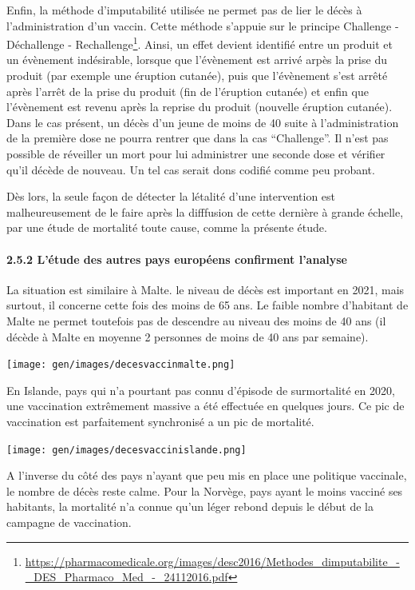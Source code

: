\documentclass[
]{article}
\begin{document}
Enfin, la méthode d'imputabilité utilisée ne permet pas de lier le décès
à l'administration d'un vaccin. Cette méthode s'appuie sur le principe
Challenge - Déchallenge - Rechallenge\footnote{\url{https://pharmacomedicale.org/images/desc2016/Methodes_dimputabilite_-_DES_Pharmaco_Med_-_24112016.pdf}}.
Ainsi, un effet devient identifié entre un produit et un évènement
indésirable, lorsque que l'évènement est arrivé arpès la prise du
produit (par exemple une éruption cutanée), puis que l'évènement s'est
arrêté après l'arrêt de la prise du produit (fin de l'éruption cutanée)
et enfin que l'évènement est revenu après la reprise du produit
(nouvelle éruption cutanée). Dans le cas présent, un décès d'un jeune de
moins de 40 suite à l'administration de la première dose ne pourra
rentrer que dans la cas ``Challenge''. Il n'est pas possible de
réveiller un mort pour lui administrer une seconde dose et vérifier
qu'il décède de nouveau. Un tel cas serait dons codifié comme peu
probant.

Dès lors, la seule façon de détecter la létalité d'une intervention est
malheureusement de le faire après la difffusion de cette dernière à
grande échelle, par une étude de mortalité toute cause, comme la
présente étude.

\hypertarget{luxe9tude-des-autres-pays-europuxe9ens-confirment-lanalyse}{%
\paragraph{2.5.2 L'étude des autres pays européens confirment
l'analyse}\label{luxe9tude-des-autres-pays-europuxe9ens-confirment-lanalyse}}

La situation est similaire à Malte. le niveau de décès est important en
2021, mais surtout, il concerne cette fois des moins de 65 ans. Le
faible nombre d'habitant de Malte ne permet toutefois pas de descendre
au niveau des moins de 40 ans (il décède à Malte en moyenne 2 personnes
de moins de 40 ans par semaine).

\texttt{[image: gen/images/decesvaccinmalte.png]}

En Islande, pays qui n'a pourtant pas connu d'épisode de surmortalité en
2020, une vaccination extrêmement massive a été effectuée en quelques
jours. Ce pic de vaccination est parfaitement synchronisé a un pic de
mortalité.

\texttt{[image: gen/images/decesvaccinislande.png]}

A l'inverse du côté des pays n'ayant que peu mis en place une politique
vaccinale, le nombre de décès reste calme. Pour la Norvège, pays ayant
le moins vacciné ses habitants, la mortalité n'a connue qu'un léger
rebond depuis le début de la campagne de vaccination.
\end{document}
